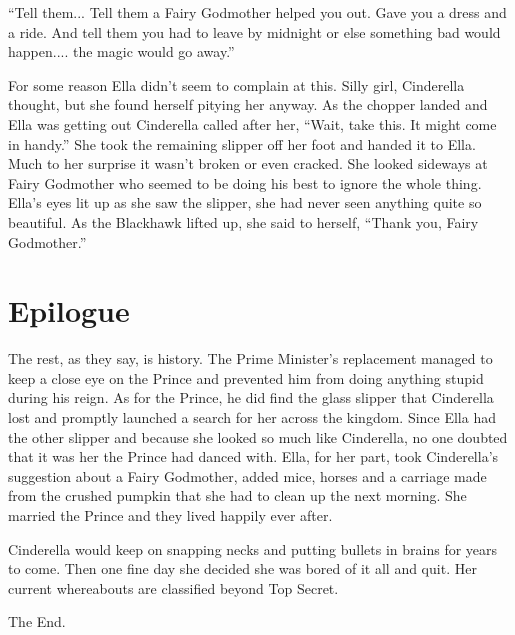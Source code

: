 \documentclass[11pt,letterpaper]{article}
\begin{document}
``Tell them... Tell them a Fairy Godmother helped you out. Gave you a dress and a ride. And tell them you had to leave by midnight or else something bad would happen.... the magic would go away.''

For some reason Ella didn't seem to complain at this. Silly girl, Cinderella thought, but she found herself pitying her anyway. As the chopper landed and Ella was getting out Cinderella called after her, ``Wait, take this. It might come in handy.'' She took the remaining slipper off her foot and handed it to Ella. Much to her surprise it wasn't broken or even cracked. She looked sideways at Fairy Godmother who seemed to be doing his best to ignore the whole thing. Ella's eyes lit up as she saw the slipper, she had never seen anything quite so beautiful. As the Blackhawk lifted up, she said to herself, ``Thank you, Fairy Godmother.''

\section*{Epilogue}
The rest, as they say, is history. The Prime Minister's replacement managed to keep a close eye on the Prince and prevented him from doing anything stupid during his reign. As for the Prince, he did find the glass slipper that Cinderella lost and promptly launched a search for her across the kingdom. Since Ella had the other slipper and because she looked so much like Cinderella, no one doubted that it was her the Prince had danced with. Ella, for her part, took Cinderella's suggestion about a Fairy Godmother, added mice, horses and a carriage made from the crushed pumpkin that she had to clean up the next morning. She married the Prince and they lived happily ever after. 

Cinderella would keep on snapping necks and putting bullets in brains for years to come.  Then one fine day she decided she was bored of it all and quit. Her current whereabouts are classified beyond Top Secret.

The End.
\end{document}
